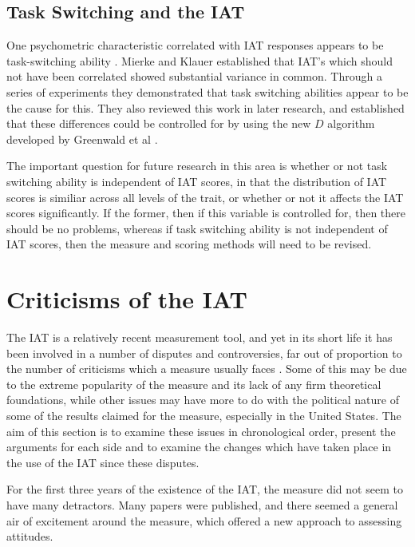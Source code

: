 \subsection{Task Switching and the IAT}
\label{sec:task-switching-iat}



One psychometric characteristic correlated with IAT responses appears to be task-switching ability \cite{Mierke2003}. Mierke and Klauer established that IAT's which should not have been correlated showed substantial variance in common.  Through a series of experiments they demonstrated that task switching abilities appear to be the cause for this. They also reviewed this work in later research, and established that these differences could be controlled for by using the new $D$ algorithm developed by Greenwald et al \cite{Greenwald2003,Klauer2005}. 

The important question for future research in this area is whether or not task switching ability is independent of IAT scores, in that the distribution of IAT scores is similiar across all levels of the trait, or whether or not it affects the IAT scores significantly. If the former, then if this variable is controlled for, then there should be no problems, whereas if task switching ability is not independent of IAT scores, then the measure and scoring methods will need to be revised.  



\section{Criticisms of the IAT}
\label{sec:crit-contr-iat}

The IAT is a relatively recent measurement tool, and yet in its short life it has been involved in a number of disputes and controversies, far out of proportion to the number of criticisms which a measure usually faces \cite{VonHippel2004}. Some of this may be due to the  extreme popularity of the measure and its lack of any firm theoretical foundations, while other issues may have more to do with the political nature of some of the results claimed for the measure, especially in the United States.  The aim of this section is to examine these issues in chronological order, present the arguments for each side and to examine the changes which have taken place in the use of the IAT since these disputes. 

For the first three years of the existence of the IAT, the measure did not seem to have many detractors. Many papers were published, and there seemed a general air of excitement around the measure, which offered a new approach to assessing attitudes. 

